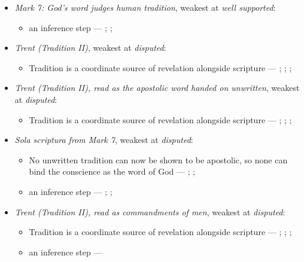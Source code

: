 \documentclass[11pt]{article}
\begin{document}
\begin{itemize}
\item \emph{Mark 7: God’s word judges human tradition}, weakest at \emph{well supported}:
\begin{itemize}
\item an inference step --- \cite[Vatican II (1965), Dei Verbum 10]{tanner-decrees-1990}; \cite[IV.x.23]{calvin-institutes-1960}; \cite[15--16]{wenham-our-lords-view-1953}
\end{itemize}
\item \emph{Trent (Tradition II)}, weakest at \emph{disputed}:
\begin{itemize}
\item Tradition is a coordinate source of revelation alongside scripture --- \cite[Trent, Session IV (1546), Decree on Sacred Books and Traditions]{tanner-decrees-1990}; \cite{mathison-shape-sola-scriptura-2001}; \cite{geiselmann-meaning-of-tradition-1966}; \cite{congar-tradition-and-traditions-1966}
\end{itemize}
\item \emph{Trent (Tradition II), read as the apostolic word handed on unwritten}, weakest at \emph{disputed}:
\begin{itemize}
\item Tradition is a coordinate source of revelation alongside scripture --- \cite[Trent, Session IV (1546), Decree on Sacred Books and Traditions]{tanner-decrees-1990}; \cite{mathison-shape-sola-scriptura-2001}; \cite{geiselmann-meaning-of-tradition-1966}; \cite{congar-tradition-and-traditions-1966}
\end{itemize}
\item \emph{Sola scriptura from Mark 7}, weakest at \emph{disputed}:
\begin{itemize}
\item No unwritten tradition can now be shown to be apostolic, so none can bind the conscience as the word of God --- \cite[503--511]{whitaker-disputation-1849}; \cite[594]{whitaker-disputation-1849}; \cite[I.6]{westminster-confession-1647}
\item an inference step --- \cite{geiselmann-meaning-of-tradition-1966}; \cite[Vatican I (1870), Pastor Aeternus, ch. 4]{tanner-decrees-1990}; \cite{florovsky-bible-church-tradition-1972}
\end{itemize}
\item \emph{Trent (Tradition II), read as commandments of men}, weakest at \emph{disputed}:
\begin{itemize}
\item Tradition is a coordinate source of revelation alongside scripture --- \cite[Trent, Session IV (1546), Decree on Sacred Books and Traditions]{tanner-decrees-1990}; \cite{mathison-shape-sola-scriptura-2001}; \cite{geiselmann-meaning-of-tradition-1966}; \cite{congar-tradition-and-traditions-1966}
\item an inference step --- \cite[IV.x.23]{calvin-institutes-1960}
\end{itemize}
\end{itemize}
\end{document}
